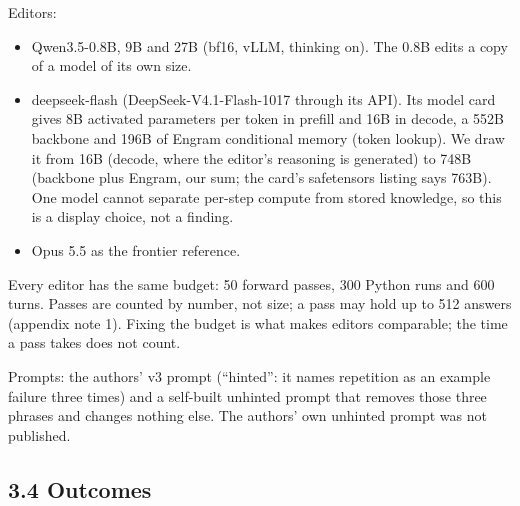 \documentclass[
  10pt,
]{article}
\providecommand{\tightlist}{%
  \setlength{\itemsep}{0pt}\setlength{\parskip}{0pt}}
\begin{document}
Editors:

\begin{itemize}
\tightlist
\item
  Qwen3.5-0.8B, 9B and 27B (bf16, vLLM, thinking on). The 0.8B edits a
  copy of a model of its own size.
\item
  deepseek-flash (DeepSeek-V4.1-Flash-1017 through its API). Its model
  card gives 8B activated parameters per token in prefill and 16B in
  decode, a 552B backbone and 196B of Engram conditional memory (token
  lookup). We draw it from 16B (decode, where the editor's reasoning is
  generated) to 748B (backbone plus Engram, our sum; the card's
  safetensors listing says 763B). One model cannot separate per-step
  compute from stored knowledge, so this is a display choice, not a
  finding.
\item
  Opus 5.5 as the frontier reference.
\end{itemize}

Every editor has the same budget: 50 forward passes, 300 Python runs and
600 turns. Passes are counted by number, not size; a pass may hold up to
512 answers (appendix note 1). Fixing the budget is what makes editors
comparable; the time a pass takes does not count.

Prompts: the authors' v3 prompt (``hinted'': it names repetition as an
example failure three times) and a self-built unhinted prompt that
removes those three phrases and changes nothing else. The authors' own
unhinted prompt was not published.

\subsection{3.4 Outcomes}\label{outcomes}
\end{document}
